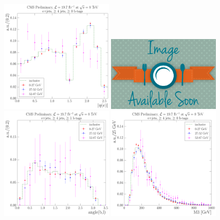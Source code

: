 \begin{figure}[hbtp]
    \centering
     \includegraphics[width=0.48\textwidth]{Chapters/04_Analysis/04b_XSections/images/8TeV/fit_variables/MET/electron_absolute_eta/qcd/MET_electron_absolute_eta_0orMoreBtag_QCD_template_comparison.pdf}\hfill
     \includegraphics[width=0.48\textwidth]{Chapters/04_Analysis/04b_XSections/images/placeholder.png}\hfill
     \includegraphics[width=0.48\textwidth]{Chapters/04_Analysis/04b_XSections/images/8TeV/fit_variables/MET/angle_bl/qcd/MET_angle_bl_1orMoreBtag_QCD_template_comparison.pdf}\hfill
     \includegraphics[width=0.48\textwidth]{Chapters/04_Analysis/04b_XSections/images/8TeV/fit_variables/MET/M3/qcd/MET_M3_0orMoreBtag_QCD_template_comparison.pdf}\\

\end{figure}

